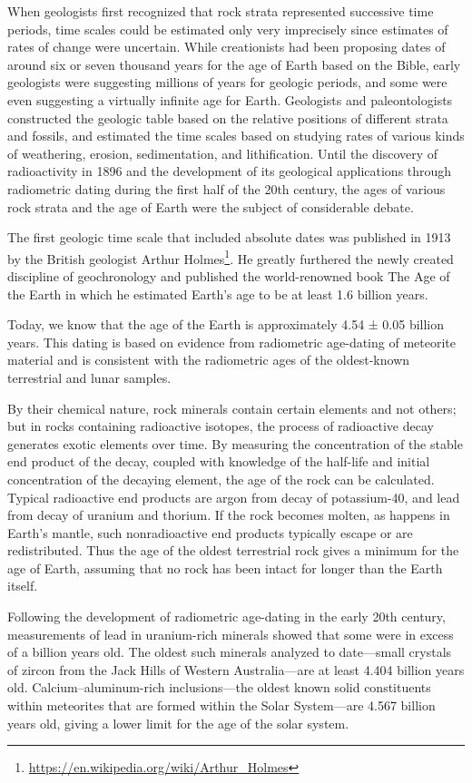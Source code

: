 \documentclass[]{book}
\let\rmarkdownfootnote\footnote%
\def\footnote{\protect\rmarkdownfootnote}
\renewcommand{\href}[2]{#2\footnote{\url{#1}}}
\theoremstyle{definition}
\theoremstyle{definition}
\theoremstyle{definition}
\theoremstyle{remark}
\begin{document}
When geologists first recognized that rock strata represented successive
time periods, time scales could be estimated only very imprecisely since
estimates of rates of change were uncertain. While creationists had been
proposing dates of around six or seven thousand years for the age of
Earth based on the Bible, early geologists were suggesting millions of
years for geologic periods, and some were even suggesting a virtually
infinite age for Earth. Geologists and paleontologists constructed the
geologic table based on the relative positions of different strata and
fossils, and estimated the time scales based on studying rates of
various kinds of weathering, erosion, sedimentation, and lithification.
Until the discovery of radioactivity in 1896 and the development of its
geological applications through radiometric dating during the first half
of the 20th century, the ages of various rock strata and the age of
Earth were the subject of considerable debate.

The first geologic time scale that included absolute dates was published
in 1913 by the British geologist \href{https://en.wikipedia.org/wiki/Arthur_Holmes}{Arthur Holmes}. He greatly furthered the
newly created discipline of geochronology and published the
world-renowned book The Age of the Earth in which he estimated Earth's
age to be at least 1.6 billion years.

Today, we know that the age of the Earth is approximately 4.54 ± 0.05
billion years. This dating is based on evidence from radiometric
age-dating of meteorite material and is consistent with the radiometric
ages of the oldest-known terrestrial and lunar samples.

By their chemical nature, rock minerals contain certain elements and not
others; but in rocks containing radioactive isotopes, the process of
radioactive decay generates exotic elements over time. By measuring the
concentration of the stable end product of the decay, coupled with
knowledge of the half-life and initial concentration of the decaying
element, the age of the rock can be calculated. Typical radioactive end
products are argon from decay of potassium-40, and lead from decay of
uranium and thorium. If the rock becomes molten, as happens in Earth's
mantle, such nonradioactive end products typically escape or are
redistributed. Thus the age of the oldest terrestrial rock gives a
minimum for the age of Earth, assuming that no rock has been intact for
longer than the Earth itself.

Following the development of radiometric age-dating in the early 20th
century, measurements of lead in uranium-rich minerals showed that some
were in excess of a billion years old. The oldest such minerals analyzed
to date---small crystals of zircon from the Jack Hills of Western
Australia---are at least 4.404 billion years old. Calcium--aluminum-rich
inclusions---the oldest known solid constituents within meteorites that
are formed within the Solar System---are 4.567 billion years old, giving
a lower limit for the age of the solar system.
\end{document}
